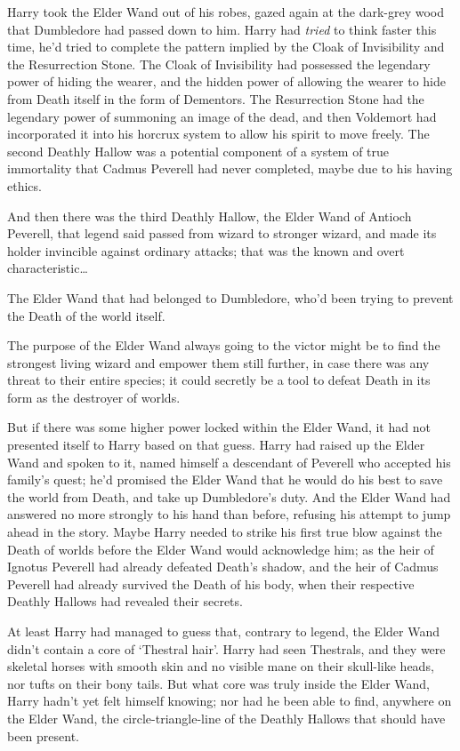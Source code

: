 Harry took the Elder Wand out of his robes, gazed again at the dark-grey wood that Dumbledore had passed down to him. Harry had \emph{tried} to think faster this time, he'd tried to complete the pattern implied by the Cloak of Invisibility and the Resurrection Stone. The Cloak of Invisibility had possessed the legendary power of hiding the wearer, and the hidden power of allowing the wearer to hide from Death itself in the form of Dementors. The Resurrection Stone had the legendary power of summoning an image of the dead, and then Voldemort had incorporated it into his horcrux system to allow his spirit to move freely. The second Deathly Hallow was a potential component of a system of true immortality that Cadmus Peverell had never completed, maybe due to his having ethics.

And then there was the third Deathly Hallow, the Elder Wand of Antioch Peverell, that legend said passed from wizard to stronger wizard, and made its holder invincible against ordinary attacks; that was the known and overt characteristic{\ldots}

The Elder Wand that had belonged to Dumbledore, who'd been trying to prevent the Death of the world itself.

The purpose of the Elder Wand always going to the victor might be to find the strongest living wizard and empower them still further, in case there was any threat to their entire species; it could secretly be a tool to defeat Death in its form as the destroyer of worlds.

But if there was some higher power locked within the Elder Wand, it had not presented itself to Harry based on that guess. Harry had raised up the Elder Wand and spoken to it, named himself a descendant of Peverell who accepted his family's quest; he'd promised the Elder Wand that he would do his best to save the world from Death, and take up Dumbledore's duty. And the Elder Wand had answered no more strongly to his hand than before, refusing his attempt to jump ahead in the story. Maybe Harry needed to strike his first true blow against the Death of worlds before the Elder Wand would acknowledge him; as the heir of Ignotus Peverell had already defeated Death's shadow, and the heir of Cadmus Peverell had already survived the Death of his body, when their respective Deathly Hallows had revealed their secrets.

At least Harry had managed to guess that, contrary to legend, the Elder Wand didn't contain a core of `Thestral hair'. Harry had seen Thestrals, and they were skeletal horses with smooth skin and no visible mane on their skull-like heads, nor tufts on their bony tails. But what core was truly inside the Elder Wand, Harry hadn't yet felt himself knowing; nor had he been able to find, anywhere on the Elder Wand, the circle-triangle-line of the Deathly Hallows that should have been present.

